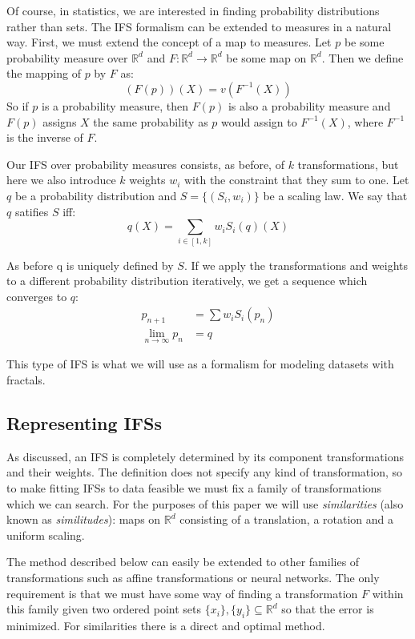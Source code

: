 \documentclass[10pt,a4paper,oneside]{article}
\theoremstyle{definition}
\begin{document}
Of course, in statistics, we are interested in finding probability distributions rather than sets. The IFS formalism can be extended to measures in a natural way. First, we must extend the concept of a map to measures. Let $p$ be some probability measure over ${\mathbb R}^d$ and $F:{\mathbb R}^d \rightarrow {\mathbb R}^d$ be some map on ${\mathbb R}^d$. Then we define the mapping of $p$ by $F$ as:
\[
(F(p))(X) = v(F^{-1}(X))
\]
So if $p$ is a probability measure, then $F(p)$ is also a probability measure and $F(p)$ assigns $X$ the same probability as $p$ would assign to $F^{-1}(X)$, where $F^{-1}$ is the inverse of $F$.

Our IFS over probability measures consists, as before, of $k$ transformations, but here we also introduce $k$ weights $w_i$ with the constraint that they sum to one. Let $q$ be a probability distribution and $S = \{(S_i, w_i)\}$ be a scaling law. We say that $q$ satifies $S$ iff:
\[
q(X) = \sum_{i\in[1, k]} w_i S_i(q)(X)
\] 

As before q is uniquely defined by $S$. If we apply the transformations and weights to a different probability distribution iteratively, we get a sequence which converges to $q$:
\begin{align*}
p_{n+1} &= \sum w_i S_i(p_n) \\
\lim_{n \rightarrow \infty} p_n &= q 
\end{align*}

This type of IFS is what we will use as a formalism for modeling datasets with fractals.

\subsection*{Representing IFSs}

As discussed, an IFS is completely determined by its component transformations and their weights. The definition does not specify any kind of transformation, so to make fitting IFSs to data feasible we must fix a family of transformations which we can search. For the purposes of this paper we will use \emph{similarities} (also known as \emph{similitudes}): maps on ${\mathbb R}^d$ consisting of a translation, a rotation and a uniform scaling.

The method described below can easily be extended to other families of transformations such as affine transformations or neural networks. The only requirement is that we must have some way of finding a transformation $F$ within this family given two ordered point sets $\{x_i\}, \{y_i\} \subseteq {\mathbb R}^d$ so that the error is minimized. For similarities there is a direct and optimal method. \cite{umeyama1991least}
\end{document}
